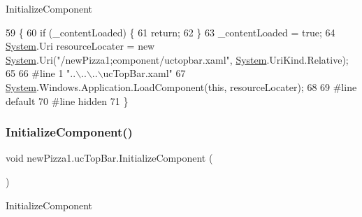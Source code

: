 Initialize\+Component 


\begin{DoxyCode}
59                                           \{
60             \textcolor{keywordflow}{if} (\_contentLoaded) \{
61                 \textcolor{keywordflow}{return};
62             \}
63             \_contentLoaded = \textcolor{keyword}{true};
64             \hyperlink{namespaceSystem}{System}.Uri resourceLocater = \textcolor{keyword}{new} \hyperlink{namespaceSystem}{System}.Uri(\textcolor{stringliteral}{"/newPizza1;component/uctopbar.xaml"}, 
      \hyperlink{namespaceSystem}{System}.UriKind.Relative);
65             
66 \textcolor{preprocessor}{            #line 1 "..\(\backslash\)..\(\backslash\)..\(\backslash\)ucTopBar.xaml"}
67             \hyperlink{namespaceSystem}{System}.Windows.Application.LoadComponent(\textcolor{keyword}{this}, resourceLocater);
68             
69 \textcolor{preprocessor}{            #line default}
70 \textcolor{preprocessor}{            #line hidden}
71         \}
\end{DoxyCode}
\mbox{\label{classnewPizza1_1_1ucTopBar_a667aed93b177538819f27c62e5e88844}} 
\subsubsection{\texorpdfstring{Initialize\+Component()}{InitializeComponent()}\hspace{0.1cm}{\footnotesize\ttfamily [3/6]}}
{\footnotesize\ttfamily void new\+Pizza1.\+uc\+Top\+Bar.\+Initialize\+Component (\begin{DoxyParamCaption}{ }\end{DoxyParamCaption})\hspace{0.3cm}{\ttfamily [inline]}}



Initialize\+Component 


